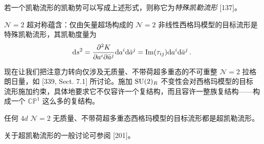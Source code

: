 \begin{definition}[18.5]
若一个凯勒流形的凯勒势可以写成上述形式，则称它为\emph{特殊凯勒流形} [137]。
\end{definition}

\begin{proposition}[18.6]
$\mathcal N=2$ 超对称蕴含：仅由矢量超场构成的 $\mathcal N=2$ 非线性西格玛模型的目标流形是特殊凯勒流形，其凯勒度量为
\[
\mathrm{d} s^2=\frac{\partial^2K}{\partial a^i\partial\bar a^j}\mathrm{d} a^i\mathrm{d}\bar a^j=\operatorname{Im}(\tau_{ij})\mathrm{d} a^i\mathrm{d}\bar a^j\,.
\]
\end{proposition}


现在让我们把注意力转向仅涉及无质量、不带荷超多重态的不可重整 $\mathcal N=2$ 拉格朗日量，如 [339, Sect. 7.1] 所讨论。施加 $\operatorname{SU}(2)_R$ 不变性会对西格玛模型的目标流形施加约束，具体地要求它不仅容许一个复结构，而且容许一整族复结构——构成一个 $\mathbb{CP}^1$ 这么多的复结构。

\begin{proposition}[18.7]
任何 $4d$ $\mathcal N=2$ 无质量、不带荷超多重态西格玛模型的目标流形都是超凯勒流形。
\end{proposition}

关于超凯勒流形的一般讨论可参阅 [201]。

